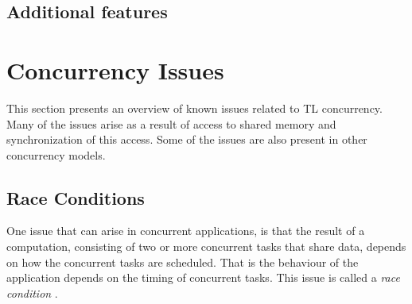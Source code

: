 \subsection{Additional features}

\section{Concurrency Issues}\label{sec:tl_ci}
This section presents an overview of known issues related to \ac{TL} concurrency. Many of the issues arise as a result of access to shared memory and synchronization of this access. Some of the issues are also present in other concurrency models.

\subsection{Race Conditions}\label{subsec:race_coditions}
One issue that can arise in concurrent applications, is that the result of a computation, consisting of two or more concurrent tasks that share data, depends on how the concurrent tasks are scheduled. That is the behaviour of the application depends on the timing of concurrent tasks. This issue is called a \emph{race condition}
\cite[p. 983]{bryant2011computer}\cite[p. 115]{tanenbaum2008modern}\cite[p. 44]{sevenModels}. 

